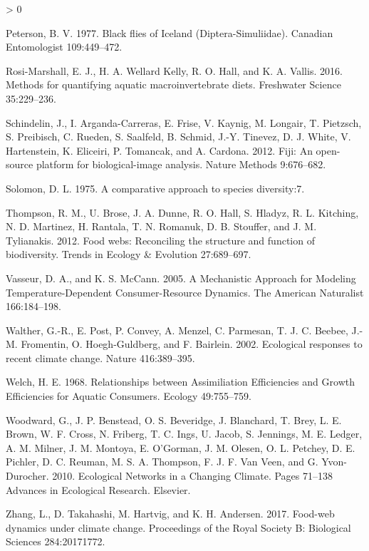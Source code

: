 \documentclass[
]{article}
\newlength{\cslhangindent}
\newenvironment{CSLReferences}[2] %
 {%
  \setlength{\parindent}{0pt}
  \ifodd #1 \everypar{\setlength{\hangindent}{\cslhangindent}}\ignorespaces\fi
  \ifnum #2 > 0
  \setlength{\parskip}{#2\baselineskip}
  \fi
 }%
 {}
\begin{document}
\begin{CSLReferences}{1}{0}
\leavevmode\hypertarget{ref-peterson1977}{}%
Peterson, B. V. 1977. Black flies of {Iceland} ({Diptera}-{Simuliidae}).
Canadian Entomologist 109:449--472.

\leavevmode\hypertarget{ref-rosi-marshall2016}{}%
Rosi-Marshall, E. J., H. A. Wellard Kelly, R. O. Hall, and K. A. Vallis.
2016. Methods for quantifying aquatic macroinvertebrate diets.
Freshwater Science 35:229--236.

\leavevmode\hypertarget{ref-schindelin2012}{}%
Schindelin, J., I. Arganda-Carreras, E. Frise, V. Kaynig, M. Longair, T.
Pietzsch, S. Preibisch, C. Rueden, S. Saalfeld, B. Schmid, J.-Y.
Tinevez, D. J. White, V. Hartenstein, K. Eliceiri, P. Tomancak, and A.
Cardona. 2012. Fiji: An open-source platform for biological-image
analysis. Nature Methods 9:676--682.

\leavevmode\hypertarget{ref-solomon1975}{}%
Solomon, D. L. 1975. A comparative approach to species diversity:7.

\leavevmode\hypertarget{ref-thompson2012}{}%
Thompson, R. M., U. Brose, J. A. Dunne, R. O. Hall, S. Hladyz, R. L.
Kitching, N. D. Martinez, H. Rantala, T. N. Romanuk, D. B. Stouffer, and
J. M. Tylianakis. 2012. Food webs: Reconciling the structure and
function of biodiversity. Trends in Ecology \& Evolution 27:689--697.

\leavevmode\hypertarget{ref-vasseur2005}{}%
Vasseur, D. A., and K. S. McCann. 2005. A {Mechanistic Approach} for
{Modeling Temperature}-{Dependent Consumer}-{Resource Dynamics}. The
American Naturalist 166:184--198.

\leavevmode\hypertarget{ref-walther2002}{}%
Walther, G.-R., E. Post, P. Convey, A. Menzel, C. Parmesan, T. J. C.
Beebee, J.-M. Fromentin, O. Hoegh-Guldberg, and F. Bairlein. 2002.
Ecological responses to recent climate change. Nature 416:389--395.

\leavevmode\hypertarget{ref-welch1968}{}%
Welch, H. E. 1968. Relationships between {Assimiliation Efficiencies}
and {Growth Efficiencies} for {Aquatic Consumers}. Ecology 49:755--759.

\leavevmode\hypertarget{ref-woodward2010b}{}%
Woodward, G., J. P. Benstead, O. S. Beveridge, J. Blanchard, T. Brey, L.
E. Brown, W. F. Cross, N. Friberg, T. C. Ings, U. Jacob, S. Jennings, M.
E. Ledger, A. M. Milner, J. M. Montoya, E. O'Gorman, J. M. Olesen, O. L.
Petchey, D. E. Pichler, D. C. Reuman, M. S. A. Thompson, F. J. F. Van
Veen, and G. Yvon-Durocher. 2010. Ecological {Networks} in a {Changing
Climate}. Pages 71--138 Advances in {Ecological Research}. {Elsevier}.

\leavevmode\hypertarget{ref-zhang2017}{}%
Zhang, L., D. Takahashi, M. Hartvig, and K. H. Andersen. 2017. Food-web
dynamics under climate change. Proceedings of the Royal Society B:
Biological Sciences 284:20171772.

\end{CSLReferences}
\end{document}
